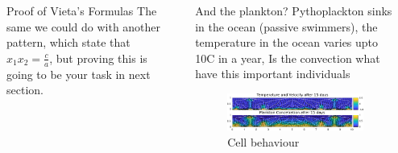 \documentclass[final]{beamer}
\newlength{\sepwid}
\newlength{\onecolwid}
\newlength{\twocolwid}
\begin{document}
\begin{frame}[t]
\begin{columns}[t]
\begin{column}{\twocolwid}
\begin{columns}[t,totalwidth=\twocolwid]
\begin{column}{\onecolwid}

\end{column} %

\begin{column}{\onecolwid} %


\begin{block}{ Proof of Vieta's Formulas}
The same we could do with another pattern, which state that $x_1 x_2 = \frac{c}{a}$, but proving this is going to be your task in next section.

\end{block}


\end{column} %

\end{columns} %

\end{column} %

\begin{column}{\sepwid}\end{column} %

\begin{column}{\onecolwid} %


\begin{block}{And the plankton?}
\textbf{}
	Pythoplackton sinks in the ocean (passive swimmers), 
the temperature in the ocean varies upto 10C in a year,
Is the convection what have this important individuals
\begin{figure}
\includegraphics[width=1.0\linewidth]{images/planktonSim.pdf}
\caption{Cell behaviour}
\end{figure}


\end{block}
\end{column}
\end{columns}
\end{frame}
\end{document}
